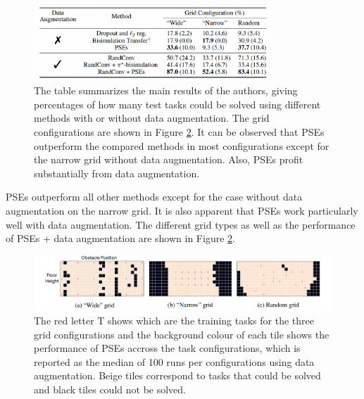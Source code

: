 \documentclass{usiinftr}
\begin{document}
\begin{figure}[h]
\centering
\includegraphics[width = 0.8\textwidth]{figures/tabular_results.png}
\caption{\label{fig: tabular_results}The table summarizes the main results of the authors, giving percentages of how many test tasks could be solved using different methods with or without data augmentation. The grid configurations are shown in Figure \ref{fig: grid_results}. It can be observed that PSEs outperform the compared methods in most configurations except for the narrow grid without data augmentation.
Also, PSEs profit substantially from data augmentation. \cite{agarwal2021contrastive}}
\end{figure}

PSEs outperform all other methods except for the case without data augmentation on the narrow grid. It is also apparent that PSEs work particularly well with data augmentation.
The different grid types as well as the performance of PSEs + data augmentation are shown in Figure \ref{fig: grid_results}.

\begin{figure}[h] 
\centering
\includegraphics[width = 1\textwidth]{figures/grid_results.png}
\caption{\label{fig: grid_results}The red letter T shows which are the training tasks for the three grid configurations and the background colour of each tile shows the performance of PSEs accross the task configurations, which is reported as the median of 100 runs per configurations using data augmentation. Beige tiles correspond to tasks that could be solved and black tiles could not be solved. \cite{agarwal2021contrastive}}
\end{figure}



\end{document}
